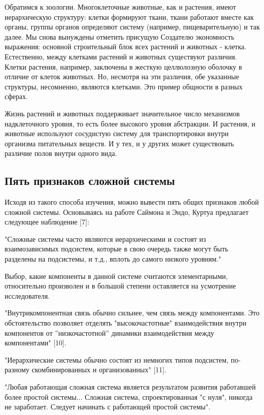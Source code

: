 \documentclass[11pt]{article}
\begin{document}
Обратимся к зоологии. Многоклеточные животные, как и растения, имеют иерархическую структуру: клетки формируют ткани, ткани работают вместе как органы, группы органов определяют систему (например, пищеварительную) и так далее. Мы снова вынуждены отметить присущую Создателю экономность выражения: основной строительный блок всех растений и животных - клетка. Естественно, между клетками растений и животных существуют различия. Клетки растения, например, заключены в жесткую целлюлозную оболочку в отличие от клеток животных. Но, несмотря на эти различия, обе указанные структуры, несомненно, являются клетками. Это пример общности в разных сферах. \bigskip 

Жизнь растений и животных поддерживает значительное число механизмов надклеточного уровня, то есть более высокого уровня абстракции. И растения, и животные используют сосудистую систему для транспортировки внутри организма питательных веществ. И у тех, и у других может существовать различие полов внутри одного вида. 
 
\subsection{Пять признаков сложной системы }
Исходя из такого способа изучения, можно вывести пять общих признаков любой сложной системы. Основываясь на работе Саймона и Эндо, Куртуа предлагает следующее наблюдение [7]: 
\begin{enumerate}
{\itshape
\item "Сложные системы часто являются иерархическими и состоят из взаимозависимых подсистем, которые в свою очередь также могут быть разделены на подсистемы, и т.д., вплоть до самого низкого уровням." 
\item Выбор, какие компоненты в данной системе считаются элементарными, относительно произволен и в большой степени оставляется на усмотрение исследователя. 
\item "Внутрикомпонентная связь обычно сильнее, чем связь между компонентами. Это обстоятельство позволяет отделять "высокочастотные" взаимодействия внутри компонентов от ''низкочастотной'' динамики взаимодействия между компонентами" [10]. 
\item "Иерархические системы обычно состоят из немногих типов подсистем, по-разному скомбинированных и организованных" [11]. 
\item "Любая работающая сложная система является результатом развития работавшей более простой системы... Сложная система, спроектированная "с нуля", никогда не заработает. Следует начинать с работающей простой системы". }
\end{enumerate}
\end{document}
